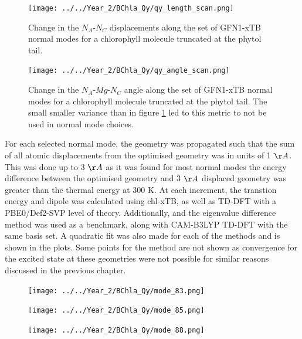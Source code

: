\begin{figure}
    \centering
    \texttt{[image: ../../Year\_2/BChla\_Qy/qy\_length\_scan.png]}
    \label{fig:qy_length_scan}
    \caption{Change in the $N_A$-$N_C$ displacements along the set of GFN1-xTB 
    normal modes for a chlorophyll molecule truncated at the phytol tail.}
\end{figure}

\begin{figure}
    \centering
    \texttt{[image: ../../Year\_2/BChla\_Qy/qy\_angle\_scan.png]}
    \label{fig:qy_angle_scan}
    \caption{Change in the $N_A$-$Mg$-$N_C$ angle along the set of GFN1-xTB normal
    modes for a chlorophyll molecule truncated at the phytol tail. The small smaller
    variance than in figure \ref{fig:qy_length_scan} led to this metric to not be
    used in normal mode choices.}
\end{figure}

For each selected normal mode, the geometry was propagated such that the sum of
all atomic displacements from the optimised geometry was in units of 1 $\AA{}$.
This was done up to 3 $\AA{}$ as it was found for most normal modes the energy 
difference between the optimised geometry and 3 $\AA{}$ displaced geometry was greater
than the thermal energy at 300 K. At each increment, the \Qy transtion energy and
dipole was calculated using chl-xTB, as well as TD-DFT with a PBE0/Def2-SVP level
of theory. Additionally, \dscf and the eigenvalue difference method was used as 
a benchmark, along with CAM-B3LYP TD-DFT with the same basis set. A quadratic
fit was also made for each of the methods and is shown in the plots. Some points
for the \dscf method are not shown as convergence for the excited state at these
geometries were not possible for similar reasons discussed in the previous chapter.

\begin{figure}
    \centering
    \texttt{[image: ../../Year\_2/BChla\_Qy/mode\_83.png]}
    \label{fig:mode_83}
\end{figure}

\begin{figure}
    \centering
    \texttt{[image: ../../Year\_2/BChla\_Qy/mode\_85.png]}
    \label{fig:mode_85}
\end{figure}

\begin{figure}
    \centering
    \texttt{[image: ../../Year\_2/BChla\_Qy/mode\_88.png]}
    \label{fig:mode_88}
\end{figure}

